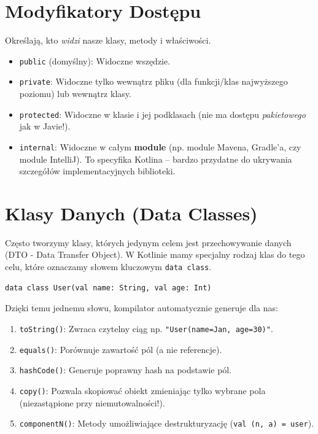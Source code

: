\section{Modyfikatory Dostępu}

Określają, kto \textit{widzi} nasze klasy, metody i właściwości.
\begin{itemize}
    \item \texttt{public} (domyślny): Widoczne wszędzie.
    \item \texttt{private}: Widoczne tylko wewnątrz pliku (dla funkcji/klas najwyższego poziomu) lub wewnątrz klasy.
    \item \texttt{protected}: Widoczne w klasie i jej podklasach (nie ma dostępu \textit{pakietowego} jak w Javie!).
    \item \texttt{internal}: Widoczne w całym \textbf{module} (np. module Mavena, Gradle'a, czy module IntelliJ). To specyfika Kotlina – bardzo przydatne do ukrywania szczegółów implementacyjnych biblioteki.
\end{itemize}

\section{Klasy Danych (Data Classes)}

Często tworzymy klasy, których jedynym celem jest przechowywanie danych (DTO - Data Transfer Object). W Kotlinie mamy specjalny rodzaj klas do tego celu, które oznaczamy słowem kluczowym \texttt{data class}.

\begin{verbatim}
data class User(val name: String, val age: Int)
\end{verbatim}

Dzięki temu jednemu słowu, kompilator automatycznie generuje dla nas:
\begin{enumerate}
    \item \texttt{toString()}: Zwraca czytelny ciąg np. \texttt{"User(name=Jan, age=30)"}.
    \item \texttt{equals()}: Porównuje zawartość pól (a nie referencje).
    \item \texttt{hashCode()}: Generuje poprawny hash na podstawie pól.
    \item \texttt{copy()}: Pozwala skopiować obiekt zmieniając tylko wybrane pola (niezastąpione przy niemutowalności!).
    \item \texttt{componentN()}: Metody umożliwiające destrukturyzację (\texttt{val (n, a) = user}).
\end{enumerate}

